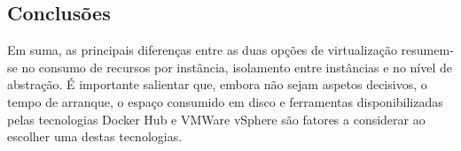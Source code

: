 
\subsection{Conclusões}

Em suma, as principais diferenças entre as duas opções de virtualização resumem-se no consumo de recursos por instância, isolamento entre instâncias e no nível de abstração. É importante salientar que, embora não sejam aspetos decisivos, o tempo de arranque, o espaço consumido em disco e ferramentas disponibilizadas pelas tecnologias {\eg} Docker Hub e VMWare vSphere são fatores a considerar ao escolher uma destas tecnologias.





